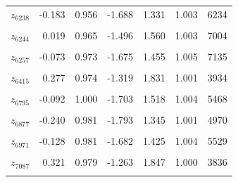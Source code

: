 \begin{longtable}{lrrrrrr}
$z_{6238}$ & -0.183 & 0.956 & -1.688 & 1.331 & 1.003 & 6234\\
\cellcolor{gray!10}{$z_{6241}$} & \cellcolor{gray!10}{-0.013} & \cellcolor{gray!10}{1.027} & \cellcolor{gray!10}{-1.641} & \cellcolor{gray!10}{1.641} & \cellcolor{gray!10}{1.001} & \cellcolor{gray!10}{7060}\\
$z_{6244}$ & 0.019 & 0.965 & -1.496 & 1.560 & 1.003 & 7004\\
\cellcolor{gray!10}{$z_{6253}$} & \cellcolor{gray!10}{-0.096} & \cellcolor{gray!10}{0.974} & \cellcolor{gray!10}{-1.641} & \cellcolor{gray!10}{1.474} & \cellcolor{gray!10}{1.003} & \cellcolor{gray!10}{5788}\\
$z_{6257}$ & -0.073 & 0.973 & -1.675 & 1.455 & 1.005 & 7135\\
\cellcolor{gray!10}{$z_{6342}$} & \cellcolor{gray!10}{0.372} & \cellcolor{gray!10}{0.971} & \cellcolor{gray!10}{-1.161} & \cellcolor{gray!10}{1.914} & \cellcolor{gray!10}{1.002} & \cellcolor{gray!10}{4189}\\
$z_{6415}$ & 0.277 & 0.974 & -1.319 & 1.831 & 1.001 & 3934\\
\cellcolor{gray!10}{$z_{6756}$} & \cellcolor{gray!10}{-0.443} & \cellcolor{gray!10}{1.016} & \cellcolor{gray!10}{-2.084} & \cellcolor{gray!10}{1.167} & \cellcolor{gray!10}{1.001} & \cellcolor{gray!10}{2531}\\
$z_{6795}$ & -0.092 & 1.000 & -1.703 & 1.518 & 1.004 & 5468\\
\cellcolor{gray!10}{$z_{6868}$} & \cellcolor{gray!10}{-0.266} & \cellcolor{gray!10}{0.998} & \cellcolor{gray!10}{-1.870} & \cellcolor{gray!10}{1.324} & \cellcolor{gray!10}{1.006} & \cellcolor{gray!10}{4575}\\
$z_{6877}$ & -0.240 & 0.981 & -1.793 & 1.345 & 1.001 & 4970\\
\cellcolor{gray!10}{$z_{6957}$} & \cellcolor{gray!10}{-0.009} & \cellcolor{gray!10}{1.002} & \cellcolor{gray!10}{-1.600} & \cellcolor{gray!10}{1.568} & \cellcolor{gray!10}{1.002} & \cellcolor{gray!10}{6935}\\
$z_{6971}$ & -0.128 & 0.981 & -1.682 & 1.425 & 1.004 & 5529\\
\cellcolor{gray!10}{$z_{6973}$} & \cellcolor{gray!10}{-0.228} & \cellcolor{gray!10}{0.950} & \cellcolor{gray!10}{-1.726} & \cellcolor{gray!10}{1.298} & \cellcolor{gray!10}{1.000} & \cellcolor{gray!10}{5324}\\
$z_{7087}$ & 0.321 & 0.979 & -1.263 & 1.847 & 1.000 & 3836\\
\cellcolor{gray!10}{$z_{7163}$} & \cellcolor{gray!10}{-0.163} & \cellcolor{gray!10}{0.940} & \cellcolor{gray!10}{-1.648} & \cellcolor{gray!10}{1.330} & \cellcolor{gray!10}{1.002} & \cellcolor{gray!10}{5682}\\

\end{longtable}

